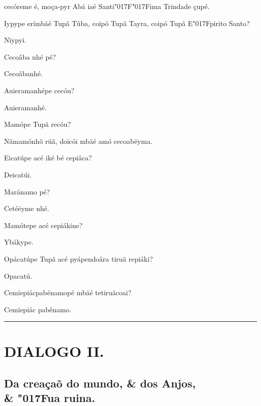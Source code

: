 \documentclass[openany,titlepage,12pt]{book}
\newcommand{\lgS}{\char"017F}
\newcommand{\lgSS}{\char"017F\char"017F}
\begin{document}
\begin{alternate}
    cecóreme é, moça-\linebreak pyr Abá iaé 
    Santi\lgSS ima Trindade çupé.
    \item Iypype erímbäé Tupã Tûba, coipó Tupã Tayra, coipó Tupã
    E\lgS pirito Santo?
    \item Nïypyi.
    \item Cecoâba nhé pé?
    \item Cecoâbanhé.
    \item Auieramanhépe cecóu?
    \item Auieramanhé.
    \item Mamópe Tupã recóu? 
    \item Nãmamónhõ rüã, doicói mbäé amó cecoabëyma.
    \item Eicatúpe acé iké bé cepiâca?
    \item Deicatúi.
    \item Maránamo pé?
    \item Cetéëyme nhé.
    \item Mamótepe acé cepiákine?
    \item Ybákype.
    \item Opácatúpe Tupã acé pyápendoâra tiruã repiáki?
    \item Opacatú.
    \item Cemïepiácpabénamopé mbäé tetiruã\linebreak coai?
    \item Cemïepiác pabênamo.
\end{alternate}

\vspace{6pt}
\par\noindent\rule{\textwidth}{0.4pt}
\unskip\vspace*{6pt}
\section{DIALOGO II.}
\subsection{Da creaçaõ do mundo, \& dos Anjos,\\
\& \lgS ua ruina.}
\end{document}
